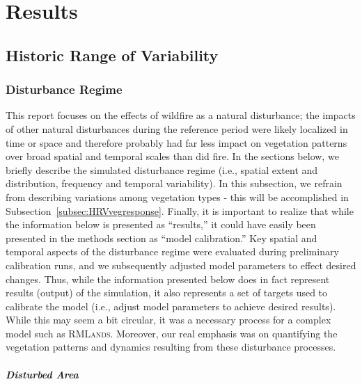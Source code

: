 \chapter{Results}

\section{Historic Range of Variability}

\subsection{Disturbance Regime}

This report focuses on the effects of wildfire as a natural disturbance; the impacts of other natural disturbances during the reference period were likely localized in time or space and therefore probably had far less impact on vegetation patterns over broad spatial and temporal scales than did fire. In the sections below, we briefly describe the simulated disturbance regime (i.e., spatial extent and distribution, frequency and temporal variability). In this subsection, we refrain from describing variations among vegetation types - this will be accomplished in Subsection~\ref{subsec:HRVvegresponse}. Finally, it is important to realize that while the information below is presented as ``results,'' it could have easily been presented in the methods section as ``model calibration.'' Key spatial and temporal aspects of the disturbance regime were evaluated during preliminary calibration runs, and we subsequently adjusted model parameters to effect desired changes. Thus, while the information presented below does in fact represent results (output) of the simulation, it also represents a set of targets used to calibrate the model (i.e., adjust model parameters to achieve desired results). While this may seem a bit circular, it was a necessary process for a complex model such as \textsc{RMLands}. Moreover, our real emphasis was on quantifying the vegetation patterns and dynamics resulting from these disturbance processes.

\paragraph{Disturbed Area}

